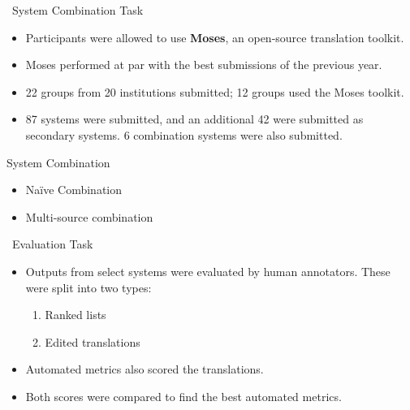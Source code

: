 \begin{frame}{\faRandom\ System Combination Task}
\begin{itemize}
    \item Participants were allowed to use \textbf{Moses}, an open-source
        translation toolkit.
    \item Moses performed at par with the best submissions of the previous year.
    \item 22 groups from 20 institutions submitted; 12 groups used the Moses toolkit.
    \item 87 systems were submitted, and an additional 42 were submitted as secondary systems. 6 combination systems were also submitted.
\end{itemize}

    \begin{block}{System Combination}
    \begin{itemize}
        \item Na\"ive Combination
        \item Multi-source combination
    \end{itemize}
\end{block}
\end{frame}

\begin{frame}{\faTimesCircle\ Evaluation Task}
    \begin{itemize}
        \item Outputs from select systems were evaluated by human annotators.
            These were split into two types:
            \begin{enumerate}
                \item Ranked lists
                \item Edited translations
            \end{enumerate}
        \item Automated metrics also scored the translations.
        \item Both scores were compared to find the best automated metrics.
    \end{itemize}
\end{frame}
